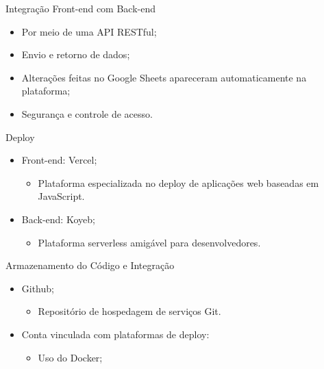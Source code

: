 \begin{frame}{Integração Front-end com Back-end}
    \begin{itemize}
        \item Por meio de uma API RESTful; \vspace{0.5cm}
        \item Envio e retorno de dados; \vspace{0.5cm}
        \item Alterações feitas no Google Sheets apareceram automaticamente na plataforma; \vspace{0.5cm}
        \item Segurança e controle de acesso. \vspace{0.5cm}
    \end{itemize}
\end{frame}

\begin{frame}{Deploy}
    \begin{itemize}
        \item Front-end: Vercel; \vspace{0.5cm}
        \begin{itemize}
            \item Plataforma especializada no deploy de aplicações web baseadas em JavaScript. \vspace{0.5cm}
        \end{itemize}
        \item Back-end: Koyeb; \vspace{0.5cm}
        \begin{itemize}
            \item Plataforma serverless amigável para desenvolvedores. \vspace{0.5cm}
        \end{itemize}
    \end{itemize}
\end{frame}

\begin{frame}{Armazenamento do Código e Integração}
    \begin{itemize}
        \item Github; \vspace{0.5cm}
        \begin{itemize}
            \item Repositório de hospedagem de serviços Git. \vspace{0.5cm}
        \end{itemize}
        \item Conta vinculada com plataformas de deploy: \vspace{0.5cm}
              \begin{itemize}
                  \item Uso do Docker; \vspace{0.5cm}
              \end{itemize}
    \end{itemize}
\end{frame}

